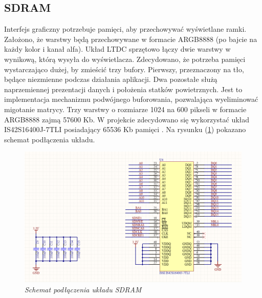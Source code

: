 \documentclass[eng,printmode]{mgr}
\begin{document}
\subsection*{SDRAM}
Interfejs graficzny potrzebuje pamięci, aby przechowywać wyświetlane ramki.  Założono, że warstwy będą przechowywane w formacie ARGB8888 (po bajcie na każdy kolor i kanał alfa). Układ LTDC sprzętowo łączy dwie warstwy w wynikową, którą wysyła do wyświetlacza. Zdecydowano, że potrzeba pamięci wystarczająco dużej, by zmieścić trzy bufory. Pierwszy, przeznaczony na tło, będące niezmienne podczas działania aplikacji. Dwa pozostałe służą naprzemiennej prezentacji danych i położenia statków powietrznych. Jest to implementacja mechanizmu podwójnego buforowania, pozwalająca wyeliminować migotanie matrycy. Trzy warstwy o rozmiarze 1024 na 600 pikseli w formacie ARGB8888 zajmą 57600 Kb. W projekcie zdecydowano się wykorzystać układ IS42S16400J-7TLI posiadający 65536 Kb pamięci \cite{sdram}. Na rysunku (\ref{fig:sdramConn}) pokazano schemat podłączenia układu.

\begin{figure}[!h]
    \centering
    \includegraphics[width=\textwidth]{schematics/sdram.png}
    \caption{\textit{Schemat podłączenia układu SDRAM}}
    \label{fig:sdramConn}
\end{figure}
\end{document}
